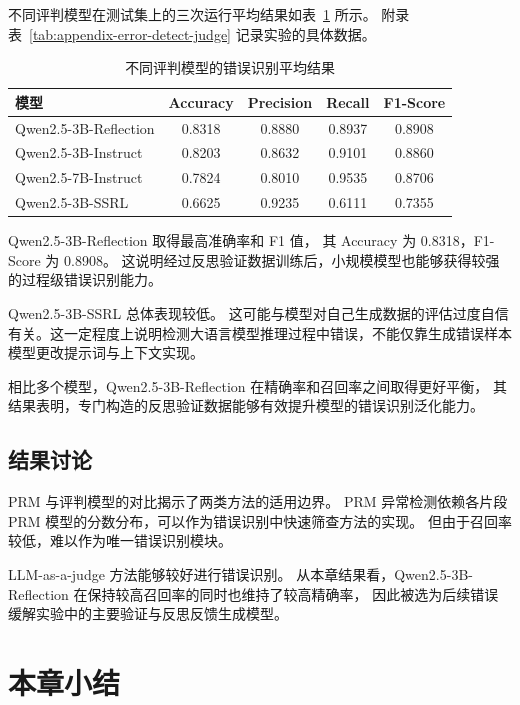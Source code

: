不同评判模型在测试集上的三次运行平均结果如表~\ref{tab:error-detect-judge-main} 所示。
附录表~\ref{tab:appendix-error-detect-judge} 记录实验的具体数据。

\begin{table}[htbp]
\caption{不同评判模型的错误识别平均结果}
\label{tab:error-detect-judge-main}
\vspace{0.5em}\centering\wuhao
\begin{tabular}{lcccc}
\toprule
模型 & Accuracy & Precision & Recall & F1-Score \\
\midrule
Qwen2.5-3B-Reflection & 0.8318 & 0.8880 & 0.8937 & 0.8908 \\
Qwen2.5-3B-Instruct & 0.8203 & 0.8632 & 0.9101 & 0.8860 \\
Qwen2.5-7B-Instruct & 0.7824 & 0.8010 & 0.9535 & 0.8706 \\
Qwen2.5-3B-SSRL & 0.6625 & 0.9235 & 0.6111 & 0.7355 \\
\bottomrule
\end{tabular}
\end{table}

Qwen2.5-3B-Reflection 取得最高准确率和 F1 值，
其 Accuracy 为 0.8318，F1-Score 为 0.8908。
这说明经过反思验证数据训练后，小规模模型也能够获得较强的过程级错误识别能力。

Qwen2.5-3B-SSRL 总体表现较低。
这可能与模型对自己生成数据的评估过度自信有关。这一定程度上说明检测大语言模型推理过程中错误，不能仅靠生成错误样本模型更改提示词与上下文实现。

相比多个模型，Qwen2.5-3B-Reflection 在精确率和召回率之间取得更好平衡，
其结果表明，专门构造的反思验证数据能够有效提升模型的错误识别泛化能力。

\subsection{结果讨论}

PRM 与评判模型的对比揭示了两类方法的适用边界。
PRM 异常检测依赖各片段 PRM 模型的分数分布，可以作为错误识别中快速筛查方法的实现。
但由于召回率较低，难以作为唯一错误识别模块。

LLM-as-a-judge 方法能够较好进行错误识别。
从本章结果看，Qwen2.5-3B-Reflection 在保持较高召回率的同时也维持了较高精确率，
因此被选为后续错误缓解实验中的主要验证与反思反馈生成模型。

\section{本章小结}

